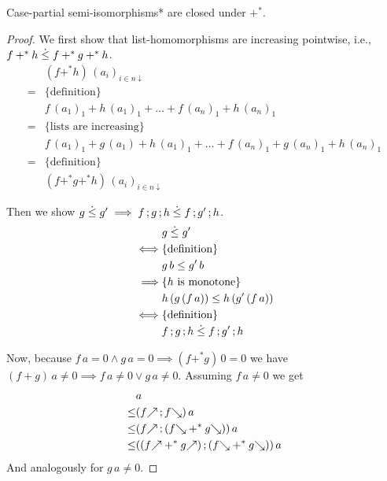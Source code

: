\documentclass[runningheads,envcountsame]{llncs}
\begin{document}
\begin{lemma}
    Case-partial semi-isomorphisms* are closed under $+^*$.
\end{lemma}
\begin{proof}
    We first show that list-homomorphisms are increasing pointwise, i.e., $f +^* h \mathrel{\dot\leq} f +^* g +^* h$.
    \begin{align}
        & (f +^*h)\,(a_i)_{i \in n\downarrow} \\
    =   & \text{\{definition\}} \\
        & f\,(a_1)_1 + h\,(a_1)_1 + \dots + f\,(a_n)_1 + h\,(a_n)_1 \\
    =   & \text{\{lists are increasing\}} \\
        & f\,(a_1)_1 + g\,(a_1) +  h\,(a_1)_1 + \dots + f\,(a_n)_1 + g\,(a_n)_1 + h\,(a_n)_1 \\
    =   & \text{\{definition\}} \\
        & (f +^*g +^*h)\,(a_i)_{i \in n\downarrow}
    \end{align}
    
    Then we show $g \dotleq g' \implies \comp{f}{\comp{g}{h}} \dotleq \comp{f}{\comp{g'}{h}}$.
    \begin{align}
        & g \dotleq g'\\
    \iff & \text{\{definition\}} \\
        & g\,b \leq g'\,b \\
    \implies & \text{\{$h$ is monotone\}} \\
        & h\,(g\,(f\,a)) \leq h\,(g'\,(f\,a)) \\
    \iff & \text{\{definition\}} \\
        & \comp{f}{\comp{g}{h}} \dotleq \comp{f}{\comp{g'}{h}}
    \end{align}
    
    Now, because $f\,a = 0 \wedge g\,a = 0 \implies (f +^* g)\,0 = 0$ we have $(f + g)\,a \neq 0 \implies f\,a \neq 0 \vee g\,a \neq 0$. Assuming $f\,a \neq 0$ we get
    \begin{align}
        & a \\
    \leq & (\comp{\f{f}}{\b{f}})\,a \\
    \leq & (\comp{\f{f}}{(\b{f} +^* \b{g})})\,a \\
    \leq & (\comp{(\f{f} +^* \f{g})}{(\b{f} +^* \b{g})})\,a \\
    \end{align}
    And analogously for $g\,a \neq 0$.
\end{proof}
\end{document}
